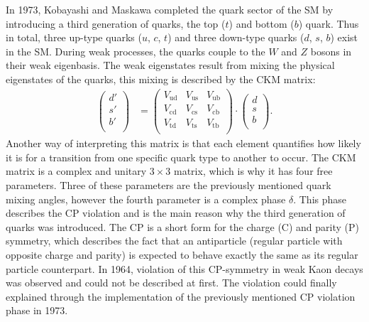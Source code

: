 In 1973, Kobayashi and Maskawa \cite{CKM_paper} completed the quark sector of the SM by introducing a third generation of quarks, the top ($t$) and bottom ($b$) quark.
Thus in total, three up-type quarks ($u$, $c$, $t$) and three down-type quarks ($d$, $s$, $b$) exist in the SM. During weak processes, the quarks couple to the
$W$ and $Z$ bosons in their weak eigenbasis. The weak eigenstates result from mixing the physical eigenstates of the quarks, this mixing is described
by the CKM matrix:
\begin{align*}
    \begin{pmatrix}
        d' \\
        s' \\
        b' \\
    \end{pmatrix}
    &=
    \begin{pmatrix}
        V_{\text{ud}} & V_{\text{us}} & V_{\text{ub}} \\
        V_{\text{cd}} & V_{\text{cs}} & V_{\text{cb}} \\
        V_{\text{td}} & V_{\text{ts}} & V_{\text{tb}} \\
    \end{pmatrix}
    \cdot
    \begin{pmatrix}
        d \\
        s \\
        b \\
    \end{pmatrix}   . 
\end{align*}
Another way of interpreting this matrix is that each element quantifies how likely it is for a transition from one specific quark type to another to occur.
The CKM matrix is a complex and unitary $3 \times 3$ matrix, which is why it has four free parameters. Three of these parameters are the previously
mentioned quark mixing angles, however the fourth parameter is a complex phase $\delta$. This phase describes the CP violation and is the main reason why the third
generation of quarks was introduced. The CP is a short form for the charge (C) and parity (P) symmetry, which describes the fact that an antiparticle (regular particle
with opposite charge and parity) is expected to behave exactly the same as its regular particle counterpart. In 1964, violation of this CP-symmetry in weak Kaon decays was
observed and could not be described at first. The violation could finally explained through the implementation of the previously mentioned CP violation phase in 1973.

